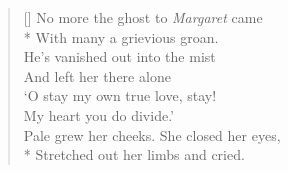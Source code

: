 \documentclass[MAIN]{subfiles}
\begin{document}
\begin{verse}[\versewidth]
No more the ghost to \emph{Margaret} came\\*
With many a grievious groan.\\
He's vanished out into the mist\\
And left her there alone\\
`O stay my own true love, stay!\\
My heart you do divide.'\\
Pale grew her cheeks. She closed her eyes,\\*
Stretched out her limbs and cried.
\end{verse}
\end{document}
